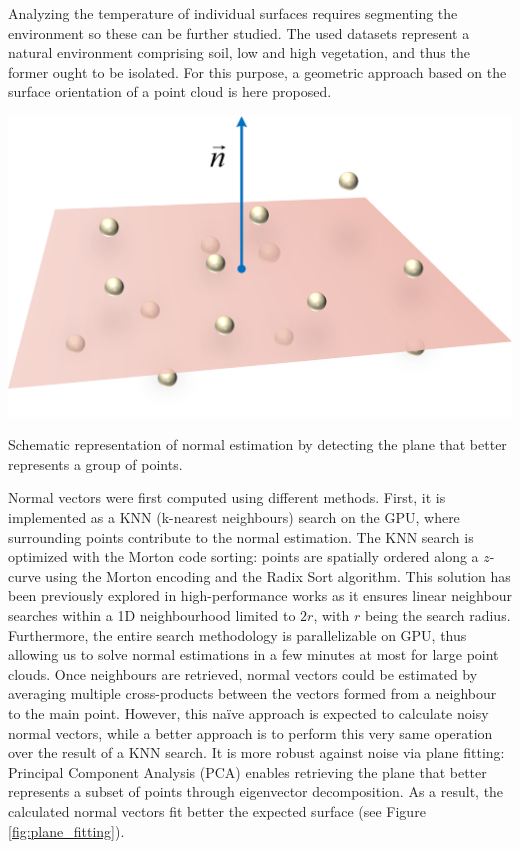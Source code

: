 Analyzing the temperature of individual surfaces requires segmenting the environment so these can be further studied. The used datasets represent a natural environment comprising soil, low and high vegetation, and thus the former ought to be isolated. For this purpose, a geometric approach based on the surface orientation of a point cloud is here proposed.

\begin{marginfigure}[1cm]
	\includegraphics{figs/thermal_projection/plane_fitting.png}
	\caption{Schematic representation of normal estimation by detecting the plane that better represents a group of points.}
	\label{fig:plane_fitting}
\end{marginfigure}
Normal vectors were first computed using different methods. First, it is implemented as a KNN (k-nearest neighbours) search on the GPU, where surrounding points contribute to the normal estimation. The KNN search is optimized with the Morton code sorting: points are spatially ordered along a $\textit{z}$-curve using the Morton encoding and the Radix Sort algorithm. This solution has been previously explored in high-performance works \cite{jakob_optimizing_2021} as it ensures linear neighbour searches within a 1D neighbourhood limited to $2r$, with $r$ being the search radius. Furthermore, the entire search methodology is parallelizable on GPU, thus allowing us to solve normal estimations in a few minutes at most for large point clouds. Once neighbours are retrieved, normal vectors could be estimated by averaging multiple cross-products between the vectors formed from a neighbour to the main point. However, this naïve approach is expected to calculate noisy normal vectors, while a better approach is to perform this very same operation over the result of a KNN search. It is more robust against noise via plane fitting: Principal Component Analysis (PCA) enables retrieving the plane that better represents a subset of points \cite{sanchez_robust_2020} through eigenvector decomposition. As a result, the calculated normal vectors fit better the expected surface (see Figure \ref{fig:plane_fitting}).

